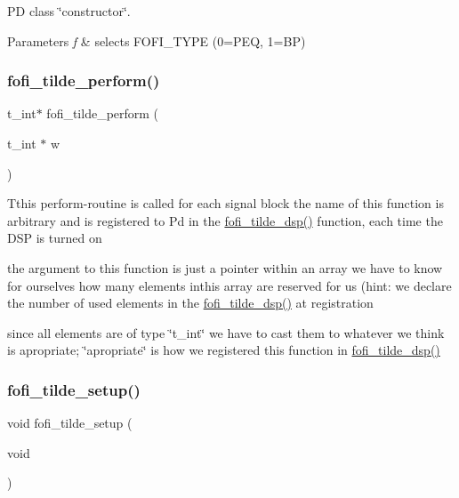 PD class \char`\"{}constructor\char`\"{}. 


\begin{DoxyParams}{Parameters}
{\em f} & selects F\+O\+F\+I\+\_\+\+T\+Y\+PE (0=P\+EQ, 1=BP) \\
\hline
\end{DoxyParams}
\mbox{\label{fofi~_8h_addff81b941469be60d263c2df0493f50}} 
\subsubsection{\texorpdfstring{fofi\_tilde\_perform()}{fofi\_tilde\_perform()}}
{\footnotesize\ttfamily t\+\_\+int$\ast$ fofi\+\_\+tilde\+\_\+perform (\begin{DoxyParamCaption}\item[{t\+\_\+int $\ast$}]{w }\end{DoxyParamCaption})}

Tthis perform-\/routine is called for each signal block the name of this function is arbitrary and is registered to Pd in the \mbox{\hyperlink{fofi~_8h_aff2a8eab6867563a3613be7a34908bb2}{fofi\+\_\+tilde\+\_\+dsp()}} function, each time the D\+SP is turned on

the argument to this function is just a pointer within an array we have to know for ourselves how many elements inthis array are reserved for us (hint\+: we declare the number of used elements in the \mbox{\hyperlink{fofi~_8h_aff2a8eab6867563a3613be7a34908bb2}{fofi\+\_\+tilde\+\_\+dsp()}} at registration

since all elements are of type \char`\"{}t\+\_\+int\char`\"{} we have to cast them to whatever we think is apropriate; \char`\"{}apropriate\char`\"{} is how we registered this function in \mbox{\hyperlink{fofi~_8h_aff2a8eab6867563a3613be7a34908bb2}{fofi\+\_\+tilde\+\_\+dsp()}} \mbox{\label{fofi~_8h_a7dd6882540d4beb229f7604500e7ef47}} 
\subsubsection{\texorpdfstring{fofi\_tilde\_setup()}{fofi\_tilde\_setup()}}
{\footnotesize\ttfamily void fofi\+\_\+tilde\+\_\+setup (\begin{DoxyParamCaption}\item[{void}]{ }\end{DoxyParamCaption})}


